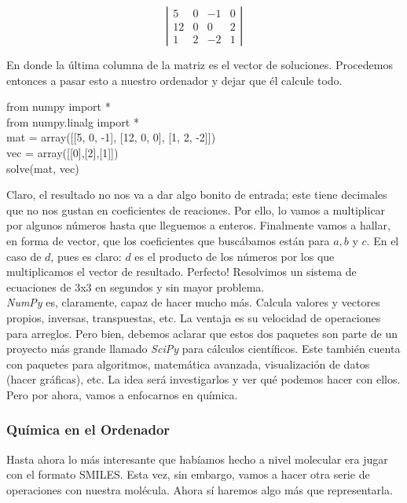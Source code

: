 \documentclass[10pt,letterpaper]{article}
\newenvironment{Code}
{
\begin{lrbox}{\selvestebox}%
\begin{minipage}{\dimexpr\columnwidth-2\fboxsep\relax}
\fontfamily{\ttdefault}\selectfont
}
{\end{minipage}\end{lrbox}%
\begin{center}
\colorbox{light-gray}{\usebox{\selvestebox}}
\end{center}
}
\begin{document}
\begin{equation}
\left|
\begin{matrix}
5 & 0 & -1 & 0\\
12 & 0 & 0 & 2\\
1 & 2 & -2 & 1
\end{matrix}
\right|
\end{equation}

En donde la \'ultima columna de la matriz es el vector de soluciones. Procedemos entonces a pasar esto a nuestro ordenador y dejar que \'el calcule todo.

\begin{Code}
from numpy import *\\
from numpy.linalg import *\\
mat = array([[5, 0, -1], [12, 0, 0], [1, 2, -2]])\\
vec = array([[0],[2],[1]])\\
solve(mat, vec)
\end{Code}

Claro, el resultado no nos va a dar algo bonito de entrada; este tiene decimales que no nos gustan en coeficientes de reaciones. Por ello, lo vamos a multiplicar por algunos n\'umeros hasta que lleguemos a enteros. Finalmente vamos a hallar, en forma de vector, que los coeficientes que busc\'abamos est\'an para $a, b$ y $c$. En el caso de $d$, pues es claro: $d$ es el producto de los n\'umeros por los que multiplicamos el vector de resultado. Perfecto! Resolvimos un sistema de ecuaciones de 3x3 en segundos y sin mayor problema.\\

\emph{NumPy} es, claramente, capaz de hacer mucho m\'as. Calcula valores y vectores propios, inversas, transpuestas, etc. La ventaja es su velocidad de operaciones para arreglos. Pero bien, debemos aclarar que estos dos paquetes son parte de un proyecto m\'as grande llamado \emph{SciPy} para c\'alculos cient\'ificos. Este tambi\'en cuenta con paquetes para algoritmos, matem\'atica avanzada, visualizaci\'on de datos (hacer gr\'aficas), etc. La idea ser\'a investigarlos y ver qu\'e podemos hacer con ellos. Pero por ahora, vamos a enfocarnos en qu\'imica.

\subsubsection{Qu\'imica en el Ordenador}
Hasta ahora lo m\'as interesante que hab\'iamos hecho a nivel molecular era jugar con el formato SMILES. Esta vez, sin embargo, vamos a hacer otra serie de operaciones con nuestra mol\'ecula. Ahora s\'i haremos algo m\'as que representarla.
\end{document}
